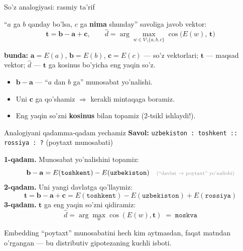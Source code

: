 \documentclass[aspectratio=169,11pt]{beamer}
\newcommand{\bunda}[1]{{\small\textbf{bunda:}\; #1}}
\begin{document}
\begin{frame}{So'z analogiyasi: rasmiy ta'rif}
  \begin{tcolorbox}[defbox,title=Ta'rif: analogiya (``a : b :: c : ?'')]
    ``$a$ ga $b$ qanday bo'lsa, $c$ ga \textbf{nima} shunday'' savoliga
    javob vektor:
    $$ \mathbf{t} = \mathbf{b} - \mathbf{a} + \mathbf{c}, \qquad
       \hat{d} = \arg\max_{w \in V \setminus \{a,b,c\}}
                 \cos\!\big(E(w),\, \mathbf{t}\big) $$
  \end{tcolorbox}
  \vspace{4pt}
  \bunda{$\mathbf{a}=E(a)$, $\mathbf{b}=E(b)$, $\mathbf{c}=E(c)$ ---
  so'z vektorlari; $\mathbf{t}$ --- maqsad vektor;
  $\hat{d}$ --- $\mathbf{t}$ ga kosinus bo'yicha eng yaqin so'z.}
  \vspace{5pt}
  \begin{itemize}\small\setlength\itemsep{3pt}
    \item $\mathbf{b}-\mathbf{a}$ --- ``$a$ dan $b$ ga'' munosabat yo'nalishi.
    \item Uni $\mathbf{c}$ ga qo'shamiz $\Rightarrow$ kerakli mintaqaga boramiz.
    \item Eng yaqin so'zni \textbf{kosinus} bilan topamiz (2-tsikl ishlaydi!).
  \end{itemize}
\end{frame}

\begin{frame}{Analogiyani qadamma-qadam yechamiz}
  \textbf{Savol:} \texttt{uzbekiston : toshkent :: rossiya : ?}
  (poytaxt munosabati)

  \vspace{4pt}
  \textbf{1-qadam.} Munosabat yo'nalishini topamiz:
  $$ \mathbf{b} - \mathbf{a} = E(\texttt{toshkent}) - E(\texttt{uzbekiston})
     \quad\text{\scriptsize\color{halfgray}(``davlat $\to$ poytaxt'' yo'nalishi)} $$
  \pause
  \textbf{2-qadam.} Uni yangi davlatga qo'llaymiz:
  $$ \mathbf{t} = \mathbf{b} - \mathbf{a} + \mathbf{c}
     = E(\texttt{toshkent}) - E(\texttt{uzbekiston}) + E(\texttt{rossiya}) $$
  \pause
  \textbf{3-qadam.} $\mathbf{t}$ ga eng yaqin so'zni qidiramiz:
  $$ \hat{d} = \arg\max_{w} \cos(E(w), \mathbf{t}) \;=\; \texttt{moskva} $$
  \begin{tcolorbox}[okbox,top=2pt,bottom=2pt]
    \small Embedding ``poytaxt'' munosabatini hech kim aytmasdan,
    faqat matndan o'rgangan --- bu distributiv gipotezaning kuchli isboti.
  \end{tcolorbox}
\end{frame}
\end{document}
